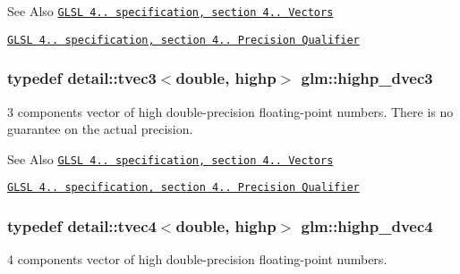 \begin{DoxySeeAlso}{See Also}
\href{http://www.opengl.org/registry/doc/GLSLangSpec.4.20.8.pdf}{\tt G\-L\-S\-L 4.. specification, section 4.. Vectors} 

\href{http://www.opengl.org/registry/doc/GLSLangSpec.4.20.8.pdf}{\tt G\-L\-S\-L 4.. specification, section 4.. Precision Qualifier} 
\end{DoxySeeAlso}
\hypertarget{group__core__precision_ga4962711854156dae8ebb4eb39237c542}{
\subsubsection[{highp\-\_\-dvec3}]{\setlength{\rightskip}{0pt plus 5cm}typedef detail\-::tvec3$<$double, highp$>$ {\bf glm\-::highp\-\_\-dvec3}}}\label{group__core__precision_ga4962711854156dae8ebb4eb39237c542}
3 components vector of high double-\/precision floating-\/point numbers. There is no guarantee on the actual precision.

\begin{DoxySeeAlso}{See Also}
\href{http://www.opengl.org/registry/doc/GLSLangSpec.4.20.8.pdf}{\tt G\-L\-S\-L 4.. specification, section 4.. Vectors} 

\href{http://www.opengl.org/registry/doc/GLSLangSpec.4.20.8.pdf}{\tt G\-L\-S\-L 4.. specification, section 4.. Precision Qualifier} 
\end{DoxySeeAlso}
\hypertarget{group__core__precision_gad5ff5ff4a69e6925f5b4f540e2633835}{
\subsubsection[{highp\-\_\-dvec4}]{\setlength{\rightskip}{0pt plus 5cm}typedef detail\-::tvec4$<$double, highp$>$ {\bf glm\-::highp\-\_\-dvec4}}}\label{group__core__precision_gad5ff5ff4a69e6925f5b4f540e2633835}
4 components vector of high double-\/precision floating-\/point numbers.


